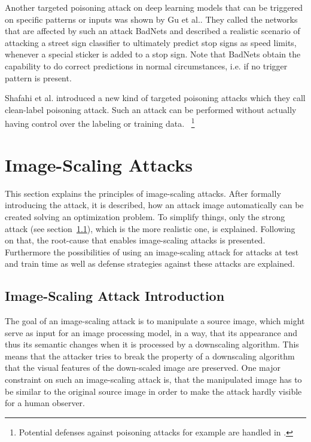 \documentclass[sigconf]{acmart}
\begin{document}
Another targeted poisoning attack on deep learning models that can be triggered on specific patterns or inputs was shown by Gu et al.\cite{8685687}.
They called the networks that are affected by such an attack BadNets and described a realistic scenario of attacking a street sign classifier to ultimately predict stop signs as speed limits, whenever a special sticker is added to a stop sign.
Note that BadNets obtain the capability to do correct predictions in normal circumstances, i.e. if no trigger pattern is present.

Shafahi et al.\cite{10.5555/3327345.3327509} introduced a new kind of targeted poisoning attacks which they call clean-label poisoning attack.
Such an attack can be performed without actually having control over the labeling or training data.
~\footnote{Potential defenses against poisoning attacks for example are handled in \cite{neuralCleanse, DBLP:journals/corr/abs-1905-13409}.}

\section{Image-Scaling Attacks}
This section explains the principles of image-scaling attacks.
After formally introducing the attack, it is described, how an attack image automatically can be created solving an optimization problem.
To simplify things, only the strong attack (see section~\ref{sec:imgscaleattack}), which is the more realistic one, is explained.
Following on that, the root-cause that enables image-scaling attacks is presented.
Furthermore the possibilities of using an image-scaling attack for attacks at test and train time as well as defense strategies against these attacks are explained.

\subsection{Image-Scaling Attack Introduction}
\label{sec:imgscaleattack}
The goal of an image-scaling attack is to manipulate a source image, which might serve as input for an image processing model, in a way, that its appearance and thus its semantic changes when it is processed by a downscaling algorithm.
This means that the attacker tries to break the property of a downscaling algorithm that the visual features of the down-scaled image are preserved.
One major constraint on such an image-scaling attack is, that the manipulated image has to be similar to the original source image in order to make the attack hardly visible for a human observer.
\end{document}
